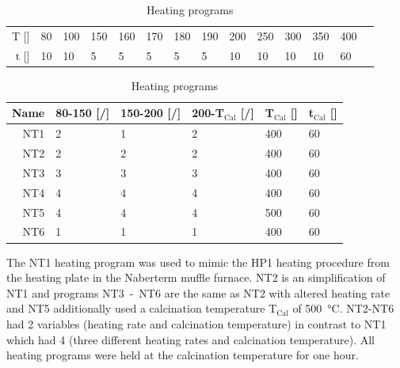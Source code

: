 \begin{table}[h]
	\centering
    \caption{Heating programs}
	\label{tab:heating}
	\label{tab:labtech}
	\begin{tabular}{rl ll ll ll ll ll ll }%
		\hline
		\hline
		T [\oc{}]	    &80		&100	&150	&160	&170 	&180	&190	&200	&250	&300	&350	&400	\\
		t [\minutes{}]	&10 	&10		&5 		&5 		&5 		&5 &5 &10 &10 &10 &10 &60 \\
		\hline
		\hline
	\end{tabular}
	\label{tab:nt}
	\begin{tabular}{rl ll ll}%
		\hline\hline
		Name	&80-150\oc{} [\oc{}/\minutes{}]	&150-200\oc{} [\oc{}/\minutes{}]	&200\oc{}-T$_{\textrm{Cal}}$ [\oc{}/\minutes{}]	&T$_{\textrm{Cal}}$ [\oc{}] &t$_{\textrm{Cal}}$ [\minutes{}]	\\
		\hline
		NT1		&2					&1					&2				&400	&60  \\
		NT2		&2					&2					&2				&400	&60  \\
		NT3		&3					&3					&3				&400	&60  \\
		NT4		&4					&4					&4				&400	&60  \\
		NT5		&4					&4					&4				&500	&60  \\
		NT6		&1					&1					&1				&400	&60  \\
		\hline\hline
	\end{tabular}
\end{table}
%
The NT1 heating program was used to mimic the HP1 heating procedure from the heating 
plate in the Naberterm muffle furnace. 
NT2 is an simplification of NT1 and programs NT3~-~NT6 are the same as NT2 with altered 
heating rate and 
NT5 additionally used a calcination temperature T$_{\textrm{Cal}}$ of \SI{500}{\celsius}.
NT2-NT6 had 2 variables (heating rate and calcination temperature) in contrast to 
NT1 which had 4 (three different heating rates and calcination temperature). 
All heating programs were held at the calcination temperature for one hour.
%

